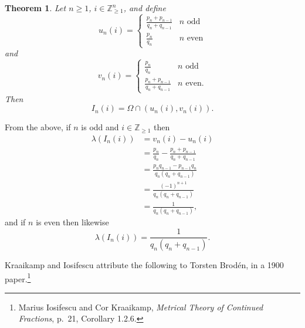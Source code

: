 \documentclass{article}
\newtheorem{theorem}{Theorem}
\theoremstyle{definition}
\begin{document}
\begin{theorem}
Let $n \geq 1$, $i \in \mathbb{Z}_{\geq 1}^n$,
and define
\[
u_n(i) = \begin{cases}
\frac{p_n+p_{n-1}}{q_n+q_{n-1}}&\textrm{$n$ odd}\\
\frac{p_n}{q_n}&\textrm{$n$ even}
\end{cases}
\]
and
\[
v_n(i) = \begin{cases}
\frac{p_n}{q_n}&\textrm{$n$ odd}\\
\frac{p_n+p_{n-1}}{q_n+q_{n-1}}&\textrm{$n$ even}.
\end{cases}
\]
Then
\[
I_n(i) = \Omega \cap (u_n(i),v_n(i)).
\]
\label{cylinder}
\end{theorem}

From the above, if $n$ is odd and $i \in \mathbb{Z}_{\geq 1}$ then 
\begin{align*}
\lambda(I_n(i)) &= v_n(i)-u_n(i)\\
&= \frac{p_n}{q_n}-\frac{p_n+p_{n-1}}{q_n+q_{n-1}}\\
&=\frac{p_nq_{n-1}-p_{n-1}q_n}{q_n(q_n+q_{n-1})}\\
&=\frac{(-1)^{n+1}}{q_n(q_n+q_{n-1})}\\
&=\frac{1}{q_n(q_n+q_{n-1})},
\end{align*}
and if $n$ is even then  likewise
\[
\lambda(I_n(i))=\frac{1}{q_n(q_n+q_{n-1})}.
\]


Kraaikamp and Iosifescu attribute the following to Torsten Brod\'en, in a 1900 paper.\footnote{Marius Iosifescu and Cor Kraaikamp,
{\em Metrical Theory of Continued Fractions}, p.~21, Corollary 1.2.6.}
\end{document}
